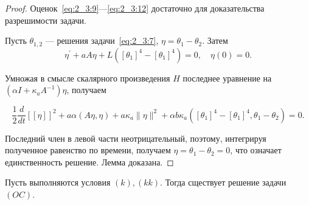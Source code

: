 \begin{proof}
    Оценок~\eqref{eq:2_3:9}—\eqref{eq:2_3:12} достаточно
    для доказательства разрешимости задачи.

    Пусть $\theta_{1,2}$ — решения задачи~\eqref{eq:2_3:7},
    $\eta=\theta_{1}-\theta_{2}$.
    Затем
    \[
        \eta^{\prime}+a A \eta+L\left(\left[\theta_{1}\right]^{4}-
        \left[\theta_{1}\right]^{4}\right)=0, \quad \eta(0)=0.
    \]


    Умножая в смысле скалярного произведения $H$ последнее уравнение на
    $\left(\alpha I+\kappa_{a} A^{-1}\right) \eta$, получаем

    \[
        \frac{1}{2} \frac{d}{d t}[[\eta]]^{2}+a \alpha(A \eta, \eta)
        + a \kappa_{a}\|\eta\|^{2}+\alpha b
        \kappa_{a}\left(\left[\theta_{1}\right]^{4}
        -\left[\theta_{1}\right]^{4}, \theta_{1}-\theta_{2}\right) = 0.
    \]


    Последний член в левой части неотрицательный,
    поэтому, интегрируя полученное равенство по времени,
    получаем $\eta=\theta_{1}-\theta_{2}=0$, что означает единственность решение.
    Лемма доказана.
\end{proof}

\begin{theorem}
    \label{th:2_3:1}
    Пусть выполняются условия $(k), (kk)$.
    Тогда сществует решение задачи $(OC)$.
\end{theorem}


